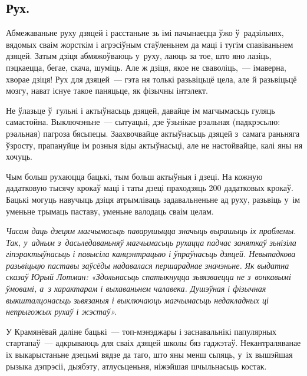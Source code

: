\subsection*{Рух.}

Абмежаваньне руху дзяцей і расстаньне зь імі пачынаецца ўжо ў~радзільнях, вядомых сваім жорсткім і агрэсіўным стаўленьнем да маці і тугім спавіваньнем дзяцей. Затым дзіця абмяжоўваюць у~руху, лаюць за тое, што яно лазіць, пэцкаецца, бегае, скача, шуміць. Але ж дзіця, якое не сваволіць,~--- імаверна, хворае дзіця! Рух для дзяцей~--- гэта ня толькі разьвіцьцё цела, але й разьвіцьцё мозгу, нават існуе такое паняцьце, як фізычны інтэлект.


Не ўлазьце ў~гульні і актыўнасьць дзяцей, давайце ім магчымасьць гуляць самастойна. Выключэньне~--- сытуацыі, дзе ўзьнікае рэальная (падкрэсьлю: рэальная) пагроза бясьпецы. Заахвочвайце актыўнасьць дзяцей з~самага раньняга ўзросту, прапануйце ім розныя віды актыўнасьці, але не настойвайце, калі яны ня хочуць. 


Чым больш рухаюцца бацькі, тым больш актыўныя і дзеці. На кожную дадатковую тысячу крокаў маці і таты дзеці праходзяць 200 дадатковых крокаў. Бацькі могуць навучыць дзіця атрымліваць задавальненьне ад руху, разьвіць у~ім уменьне трымаць паставу, уменьне валодаць сваім целам. 

\emph{Часам даць дзецям магчымасьць паварушыцца значыць вырашыць іх праблемы. Так, у~адным з~дасьледаваньняў магчымасьць рухацца падчас заняткаў зьнізіла гіпэрактыўнасьць і павысіла канцэнтрацыю і ўпраўнасьць дзяцей. Невыпадкова разьвіцьцю паставы заўсёды надавалася першараднае значэньне. Як выдатна сказаў Юрый Лотман: «Здольнасьць спатыкнуцца зьвязваецца не з~вонкавымі ўмовамі, а~з характарам і выхаваньнем чалавека. Душэўная і фізычная выкшталцонасьць зьвязаныя і выключаюць магчымасьць недакладных ці непрыгожых рухаў і жэстаў».}

У Крамянёвай даліне бацькі~--- топ-мэнэджары і заснавальнікі папулярных стартапаў~--- адкрываюць для сваіх дзяцей школы бяз гаджэтаў. Некантраляванае іх выкарыстаньне дзецьмі вядзе да таго, што яны менш сьпяць, у~іх вышэйшая рызыка дэпрэсіі, дыябэту, атлусьценьня, ніжэйшая шчыльнасьць костак.

